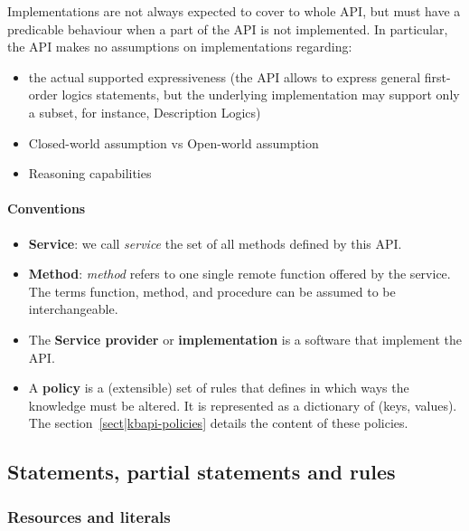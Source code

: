 Implementations are not always expected to cover to whole API, but must have a
predicable behaviour when a part of the API is not implemented. In particular,
the API makes no assumptions on implementations regarding:

\begin{itemize}
    \item  the actual supported expressiveness (the API allows to express
    general first-order logics statements, but the underlying implementation
    may support only a subset, for instance, Description Logics)
    \item  Closed-world assumption vs Open-world assumption
    \item  Reasoning capabilities
\end{itemize}

\paragraph{Conventions}

\begin{itemize}

    \item  \textbf{Service}: we call \emph{service} the set of all methods
    defined by this API.

    \item  \textbf{Method}: \emph{method} refers to one single remote function
    offered by the service. The terms function, method, and procedure can be
    assumed to be interchangeable.

    \item  The \textbf{Service provider} or \textbf{implementation} is a
    software that implement the API.

    \item  A \textbf{policy} is a (extensible) set of rules that defines in
    which ways the knowledge must be altered. It is represented as a dictionary
    of (keys, values). The section~\ref{sect|kbapi-policies} details the
    content of these policies.

\end{itemize}

\subsection{Statements, partial statements and rules}


\subsubsection{Resources and literals}


